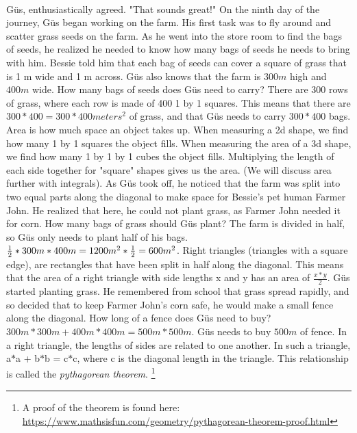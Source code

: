  \paragraph{} Güs, enthusiastically agreed. "That sounds great!"
 \pagebreak
{On the ninth day of the journey, Güs began working on the farm. His first task was to fly around and scatter grass seeds on the farm. As he went into the store room to find the bags of seeds, he realized he needed to know how many bags of seeds he needs to bring with him. Bessie told him that each bag of seeds can cover a square of grass that is 1 m wide and 1 m across. Güs also knows that the farm is $300 m$ high and $400 m$ wide. How many bags of seeds does Güs need to carry?}
{There are 300 rows of grass, where each row is made of 400 1 by 1 squares. This means that there are $300\ast 400 = 300\ast 400 meters^{2}$ of grass, and that Güs needs to carry $300\ast 400$ bags.}
{Area is how much space an object takes up. When measuring a 2d shape, we find how many 1 by 1 squares the object fills. When measuring the area of a 3d shape, we find how many 1 by 1 by 1 cubes the object fills. Multiplying the length of each side together for "square" shapes gives us the area. (We will discuss area further with integrals).}
{}
{As Güs took off, he noticed that the farm was split into two equal parts along the diagonal to make space for Bessie's pet human Farmer John. He realized that here, he could not plant grass, as Farmer John needed it for corn. How many bags of grass should Güs plant?}
{The farm is divided in half, so Güs only needs to plant half of his bags. $\frac{1}{2}\ast 300m\ast 400m\linebreak=1200m^{2}\ast\frac{1}{2} \linebreak=600m^{2}$.}
{Right triangles (triangles with a square edge), are rectangles that have been split in half along the diagonal. This means that the area of a right triangle with side lengths x and y has an area of $\frac{x\ast y}{2}$.}
{}
{Güs started planting grass. He remembered from school that grass spread rapidly, and so decided that to keep Farmer John's corn safe, he would make a small fence along the diagonal. How long of a fence does Güs need to buy?}
{$300m\ast 300m + 400m\ast 400m = 500m\ast 500m$. Güs needs to buy $500m$ of fence.}
{In a right triangle, the lengths of sides are related to one another. In such a triangle, a$\ast$a + b$\ast$b = c$\ast$c, where c is the diagonal length in the triangle. This relationship is called the \textit{pythagorean theorem}. \footnote{A proof of the theorem is found here: \url{https://www.mathsisfun.com/geometry/pythagorean-theorem-proof.html}}}
